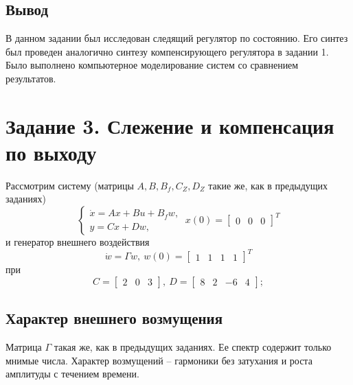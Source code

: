\documentclass[a4paper, 12pt]{article}
\begin{document}
    \subsection{Вывод}
    В данном задании был исследован следящий регулятор по состоянию.
    Его синтез был проведен аналогично синтезу компенсирующего регулятора в задании 1.
    Было выполнено компьютерное моделирование систем со сравнением результатов.


    \section{Задание 3. Слежение и компенсация по выходу}
    Рассмотрим систему (матрицы $A,B,B_f,C_Z,D_Z$ такие же, как в предыдущих заданиях)
    $$
    \begin{cases}
        \dot{x}=Ax+Bu+B_f w,\\
        y=Cx+D w,
    \end{cases}\ x(0)=\begin{bmatrix}
        0 &0 &0
    \end{bmatrix}^T
    $$
    и генератор внешнего воздействия
    $$
    \dot{ w}=\Gamma w,\  w(0)=\begin{bmatrix}
        1 &1 &1 &1
    \end{bmatrix}^T
    $$
    при
    $$
    C=\begin{bmatrix}
        2 &0 &3
    \end{bmatrix},\ D=\begin{bmatrix}
        8 &2 &-6 &4
    \end{bmatrix};
    $$


    \subsection{Характер внешнего возмущения}
    Матрица $\Gamma$ такая же, как в предыдущих заданиях. Ее спектр
    содержит только мнимые числа.
    Характер возмущений -- гармоники
    без затухания и роста амплитуды с течением времени.
\end{document}
